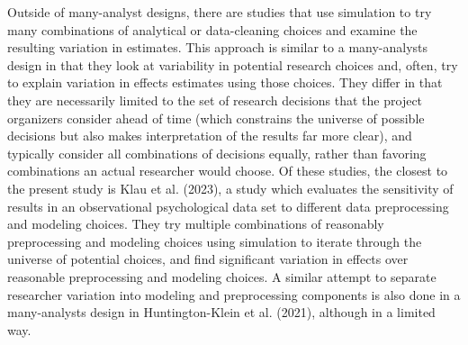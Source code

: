 \documentclass[
  letterpaper,
  DIV=11,
  numbers=noendperiod]{scrartcl}
\begin{document}
Outside of many-analyst designs, there are studies that use simulation
to try many combinations of analytical or data-cleaning choices and
examine the resulting variation in estimates. This approach is similar
to a many-analysts design in that they look at variability in potential
research choices and, often, try to explain variation in effects
estimates using those choices. They differ in that they are necessarily
limited to the set of research decisions that the project organizers
consider ahead of time (which constrains the universe of possible
decisions but also makes interpretation of the results far more clear),
and typically consider all combinations of decisions equally, rather
than favoring combinations an actual researcher would choose. Of these
studies, the closest to the present study is Klau et al. (2023), a study
which evaluates the sensitivity of results in an observational
psychological data set to different data preprocessing and modeling
choices. They try multiple combinations of reasonably preprocessing and
modeling choices using simulation to iterate through the universe of
potential choices, and find significant variation in effects over
reasonable preprocessing and modeling choices. A similar attempt to
separate researcher variation into modeling and preprocessing components
is also done in a many-analysts design in Huntington-Klein et al.
(2021), although in a limited way.
\end{document}
